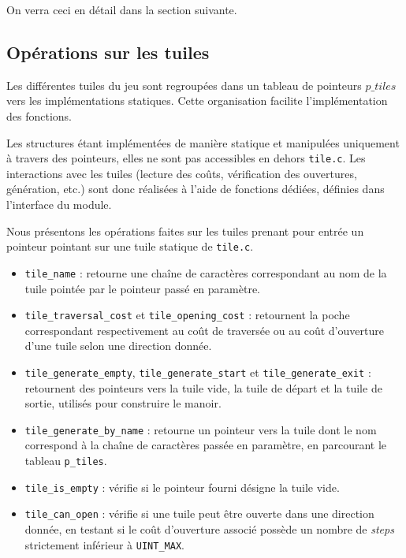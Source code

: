 On verra ceci en détail dans la section suivante.

\subsection{Opérations sur les tuiles}

Les différentes tuiles du jeu sont regroupées dans un tableau de pointeurs $p\_tiles$ vers les implémentations statiques. Cette organisation facilite l'implémentation des fonctions.

Les structures étant implémentées de manière statique et manipulées uniquement à travers des pointeurs, elles ne sont pas accessibles en dehors \texttt{tile.c}. Les interactions avec les tuiles (lecture des coûts, vérification des ouvertures, génération, etc.) sont donc réalisées à l’aide de fonctions dédiées, définies dans l’interface du module.

Nous présentons les opérations faites sur les tuiles prenant pour entrée un pointeur pointant sur une tuile statique de \texttt{tile.c}.

\begin{itemize}
  \item \texttt{tile\_name} : retourne une chaîne de caractères correspondant au nom de la tuile pointée par le pointeur passé en paramètre.

  \item \texttt{tile\_traversal\_cost} et \texttt{tile\_opening\_cost} : retournent la poche correspondant respectivement au coût de traversée ou au coût d’ouverture d’une tuile selon une direction donnée.

  \item \texttt{tile\_generate\_empty}, \texttt{tile\_generate\_start} et \texttt{tile\_generate\_exit} : retournent des pointeurs vers la tuile vide, la tuile de départ et la tuile de sortie, utilisés pour construire le manoir.

  \item \texttt{tile\_generate\_by\_name} : retourne un pointeur vers la tuile dont le nom correspond à la chaîne de caractères passée en paramètre, en parcourant le tableau \texttt{p\_tiles}.

  \item \texttt{tile\_is\_empty} : vérifie si le pointeur fourni désigne la tuile vide.

  \item \texttt{tile\_can\_open} : vérifie si une tuile peut être ouverte dans une direction donnée, en testant si le coût d’ouverture associé possède un nombre de \textit{steps} strictement inférieur à \texttt{UINT\_MAX}.
\end{itemize}

